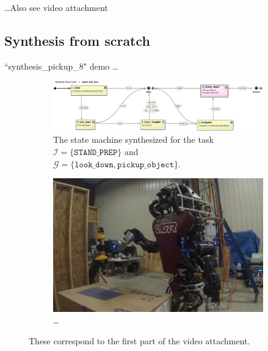 
\ldots Also see video attachment


\subsection{Synthesis from scratch}

``synthesis\_pickup\_8" demo \ldots

\begin{figure}[t]
	\centering
	\begin{subfigure}[b]{0.99\columnwidth}
	\includegraphics[width=0.99\columnwidth,clip]{./img/stand_and_pick_sm.png}
	\caption{The state machine synthesized for the task $\mathcal{I} = \{ \mathtt{STAND\_PREP} \}$ and $\mathcal{G} = \{ \mathtt{look\_down}, \mathtt{pickup\_object} \}$.
	}
	\label{Fig:stand_and_pick_sm}
	\end{subfigure}
	
	\vspace{4 pt}
	\begin{subfigure}[b]{0.95\columnwidth}
	\includegraphics[width=0.99\columnwidth, clip]{./img/stand_and_pick_gopro.png}
	\caption{\ldots
	} 
	\label{Fig:runtime2}
	\end{subfigure}
	\caption{These correspond to the first part of the video attachment.
	}
	\label{Fig:stand_and_pick_demo}
\end{figure}

